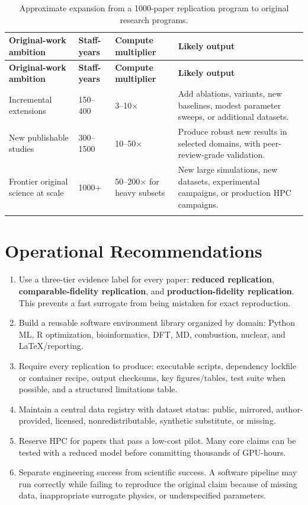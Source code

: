 \documentclass[11pt,letterpaper]{article}
\begin{document}
\begin{longtable}{p{4.2cm}p{3.5cm}p{3.5cm}p{5.0cm}}
\toprule
\textbf{Original-work ambition} & \textbf{Staff-years} & \textbf{Compute multiplier} & \textbf{Likely output} \\
\midrule
\endfirsthead
\toprule
\textbf{Original-work ambition} & \textbf{Staff-years} & \textbf{Compute multiplier} & \textbf{Likely output} \\
\midrule
\endhead
Incremental extensions & 150--400 & 3--10$\times$ & Add ablations, variants, new baselines, modest parameter sweeps, or additional datasets. \\
\addlinespace
New publishable studies & 300--1500 & 10--50$\times$ & Produce robust new results in selected domains, with peer-review-grade validation. \\
\addlinespace
Frontier original science at scale & 1000+ & 50--200$\times$ for heavy subsets & New large simulations, new datasets, experimental campaigns, or production HPC campaigns. \\
\bottomrule
\caption{Approximate expansion from a 1000-paper replication program to original research programs.}
\end{longtable}

\section{Operational Recommendations}

\begin{enumerate}
\item Use a three-tier evidence label for every paper: \textbf{reduced replication}, \textbf{comparable-fidelity replication}, and \textbf{production-fidelity replication}. This prevents a fast surrogate from being mistaken for exact reproduction.
\item Build a reusable software environment library organized by domain: Python ML, R optimization, bioinformatics, DFT, MD, combustion, nuclear, and LaTeX/reporting.
\item Require every replication to produce: executable scripts, dependency lockfile or container recipe, output checksums, key figures/tables, test suite when possible, and a structured limitations table.
\item Maintain a central data registry with dataset status: public, mirrored, author-provided, licensed, nonredistributable, synthetic substitute, or missing.
\item Reserve HPC for papers that pass a low-cost pilot. Many core claims can be tested with a reduced model before committing thousands of GPU-hours.
\item Separate engineering success from scientific success. A software pipeline may run correctly while failing to reproduce the original claim because of missing data, inappropriate surrogate physics, or underspecified parameters.
\end{enumerate}
\end{document}
